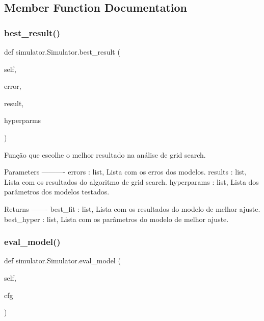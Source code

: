 \subsection{Member Function Documentation}
\mbox{\label{classsimulator_1_1Simulator_aea3c3b69d35a9a81fb0f01548f000a99}} 
\subsubsection{\texorpdfstring{best\+\_\+result()}{best\_result()}}
{\footnotesize\ttfamily def simulator.\+Simulator.\+best\+\_\+result (\begin{DoxyParamCaption}\item[{}]{self,  }\item[{}]{error,  }\item[{}]{result,  }\item[{}]{hyperparms }\end{DoxyParamCaption})}

\begin{DoxyVerb}Função que escolhe o melhor resultado na análise de grid search.

Parameters
----------
errors : list,
    Lista com os erros dos modelos.
results : list,
    Lista com os resultados do algoritmo de grid search.
hyperparams : list,
    Lista dos parâmetros dos modelos testados.

Returns
-------
best_fit : list,
    Lista com os resultados do modelo de melhor ajuste.
best_hyper : list,
    Lista com os parâmetros do modelo de melhor ajuste.
\end{DoxyVerb}
 \mbox{\label{classsimulator_1_1Simulator_a58894faf1432a59b07a8a43af838bc9e}} 
\subsubsection{\texorpdfstring{eval\+\_\+model()}{eval\_model()}}
{\footnotesize\ttfamily def simulator.\+Simulator.\+eval\+\_\+model (\begin{DoxyParamCaption}\item[{}]{self,  }\item[{}]{cfg }\end{DoxyParamCaption})}

